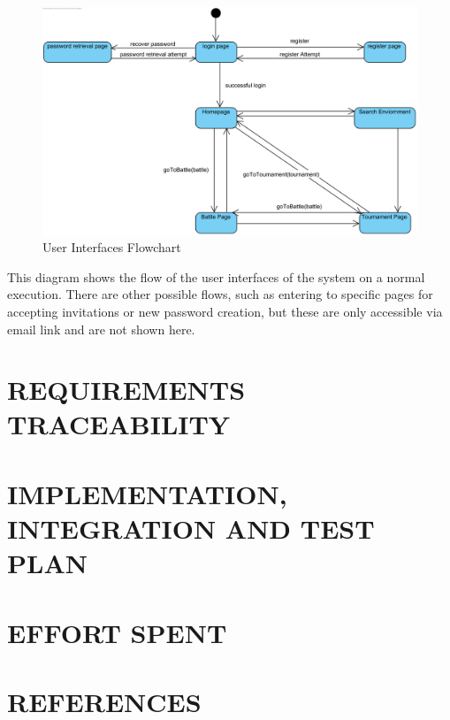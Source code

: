 \documentclass{article}
\begin{document}
\begin{figure}[H]
    \centering
    \includegraphics[width=1\textwidth]{images/UI/UserInterfaceFlowchart.png}
    \caption{User Interfaces Flowchart}
    \label{fig:UserInterfacesFlowchart}
\end{figure}

This diagram shows the flow of the user interfaces of the system on a normal execution. There are other
possible flows, such as entering to specific pages for accepting invitations or new password creation, but
these are only accessible via email link and are not shown here.

\section{REQUIREMENTS TRACEABILITY}

\section{IMPLEMENTATION, INTEGRATION AND TEST PLAN}

\section{EFFORT SPENT}

\section{REFERENCES}
\end{document}
